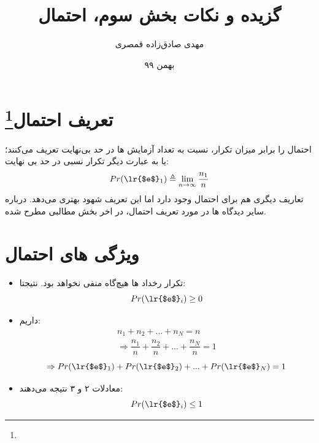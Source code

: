 \documentclass[12pt,onecolumn,a4paper]{article}
\begin{document}
\title{گزیده و نکات بخش سوم، احتمال\\} 
\author{مهدی صادق‌زاده قمصری}
\date{بهمن ۹۹}
\maketitle

\section{تعریف احتمال\footnote{}} 
احتمال را برابر میزان تکرار، نسبت به تعداد آزمایش ها در حد بی‌نهایت تعریف می‌کنند؛ یا به عبارت دیگر تکرار نسبی در حد بی نهایت:
\begin{equation}
    Pr(\text{\lr{$e$}}_1) \triangleq \lim_{n \rightarrow \infty} {\dfrac{n_1}{n}}
\end{equation}
تعاریف دیگری هم برای احتمال وجود دارد اما این تعریف شهود بهتری می‌دهد. درباره سایر دیدگاه ها در مورد تعریف احتمال، در اخر بخش مطالبی مطرح شده.

\section{ویژگی های احتمال}
\begin{itemize}
    \item تکرار رخداد ها هیچ‌گاه منفی نخواهد بود. نتیجتا:
        \begin{equation}
            Pr(\text{\lr{$e$}}_i) \geq 0
        \end{equation}
    \item داریم:
        \begin{align*}
            n_1 + n_2 + ... + n_N = n \\
            \Rightarrow \dfrac{n_1}{n} + \dfrac{n_2}{n} + ... + \dfrac{n_N}{n} = 1
        \end{align*}
        \begin{equation}
            \Rightarrow Pr(\text{\lr{$e$}}_1) + Pr(\text{\lr{$e$}}_2) + ... + Pr(\text{\lr{$e$}}_N) = 1
        \end{equation}
    \item معادلات ۲ و ۳ نتیجه می‌دهند:
        \begin{equation}
            Pr(\text{\lr{$e$}}_i) \leq 1
        \end{equation}
\end{itemize}
\end{document}
